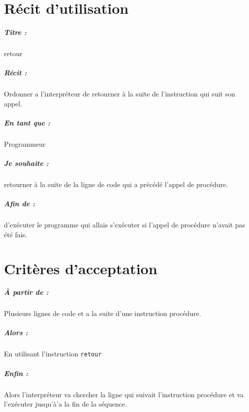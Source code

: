 \documentclass[12pt,a5paper, notitle, oneside]{report}
\begin{document}
	
	\chapter*{Récit d'utilisation}
	
	\paragraph{Titre : } retour
	\paragraph{Récit : } Ordonner a l'interpréteur de retourner à la suite de l'instruction qui suit son appel.
	\paragraph{En tant que : } Programmeur
	\paragraph{Je souhaite : } retourner à la suite de la ligne de code qui a précédé l'appel de procédure.
	\paragraph{Afin de : } d'exécuter le programme qui allais s'exécuter si l'appel de procédure n'avait pas été fais.
	\newpage
	
	\chapter*{Critères d'acceptation}
	
	\paragraph{À partir de : } Plusieurs lignes de code et a la suite d'une instruction procédure.
	
	\paragraph{Alors : } En utilisant l'instruction \verb|retour|
	
	\paragraph{Enfin : } Alors l'interpréteur va chercher la ligne qui suivait l'instruction procédure et va l'exécuter jusqu'à'a la fin de la séquence.
	
\end{document}
